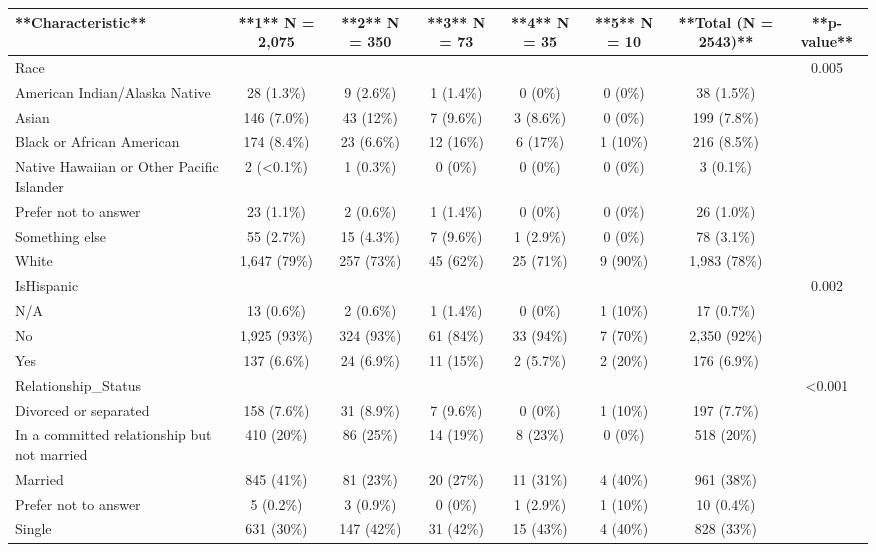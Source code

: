 
\begin{tabular}{l|c|c|c|c|c|c|c}
\hline
**Characteristic** & **1**  N = 2,075 & **2**  N = 350 & **3**  N = 73 & **4**  N = 35 & **5**  N = 10 & **Total (N = 2543)** & **p-value**\\
\hline
Race &  &  &  &  &  &  & 0.005\\
\hline
American Indian/Alaska Native & 28 (1.3\%) & 9 (2.6\%) & 1 (1.4\%) & 0 (0\%) & 0 (0\%) & 38 (1.5\%) & \\
\hline
Asian & 146 (7.0\%) & 43 (12\%) & 7 (9.6\%) & 3 (8.6\%) & 0 (0\%) & 199 (7.8\%) & \\
\hline
Black or African American & 174 (8.4\%) & 23 (6.6\%) & 12 (16\%) & 6 (17\%) & 1 (10\%) & 216 (8.5\%) & \\
\hline
Native Hawaiian or Other Pacific Islander & 2 (<0.1\%) & 1 (0.3\%) & 0 (0\%) & 0 (0\%) & 0 (0\%) & 3 (0.1\%) & \\
\hline
Prefer not to answer & 23 (1.1\%) & 2 (0.6\%) & 1 (1.4\%) & 0 (0\%) & 0 (0\%) & 26 (1.0\%) & \\
\hline
Something else & 55 (2.7\%) & 15 (4.3\%) & 7 (9.6\%) & 1 (2.9\%) & 0 (0\%) & 78 (3.1\%) & \\
\hline
White & 1,647 (79\%) & 257 (73\%) & 45 (62\%) & 25 (71\%) & 9 (90\%) & 1,983 (78\%) & \\
\hline
IsHispanic &  &  &  &  &  &  & 0.002\\
\hline
N/A & 13 (0.6\%) & 2 (0.6\%) & 1 (1.4\%) & 0 (0\%) & 1 (10\%) & 17 (0.7\%) & \\
\hline
No & 1,925 (93\%) & 324 (93\%) & 61 (84\%) & 33 (94\%) & 7 (70\%) & 2,350 (92\%) & \\
\hline
Yes & 137 (6.6\%) & 24 (6.9\%) & 11 (15\%) & 2 (5.7\%) & 2 (20\%) & 176 (6.9\%) & \\
\hline
Relationship\_Status &  &  &  &  &  &  & <0.001\\
\hline
Divorced or separated & 158 (7.6\%) & 31 (8.9\%) & 7 (9.6\%) & 0 (0\%) & 1 (10\%) & 197 (7.7\%) & \\
\hline
In a committed relationship but not married & 410 (20\%) & 86 (25\%) & 14 (19\%) & 8 (23\%) & 0 (0\%) & 518 (20\%) & \\
\hline
Married & 845 (41\%) & 81 (23\%) & 20 (27\%) & 11 (31\%) & 4 (40\%) & 961 (38\%) & \\
\hline
Prefer not to answer & 5 (0.2\%) & 3 (0.9\%) & 0 (0\%) & 1 (2.9\%) & 1 (10\%) & 10 (0.4\%) & \\
\hline
Single & 631 (30\%) & 147 (42\%) & 31 (42\%) & 15 (43\%) & 4 (40\%) & 828 (33\%) & \\

\end{tabular}
